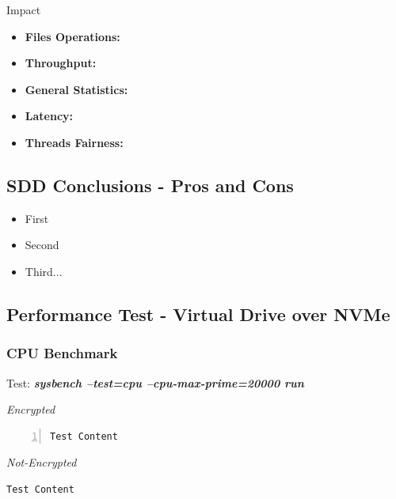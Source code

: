 Impact
\begin{itemize}
  \item \textbf{Files Operations:} 
  \item \textbf{Throughput:} 
  \item \textbf{General Statistics:}
  \item \textbf{Latency:}
  \item \textbf{Threads Fairness:}
\end{itemize}

\newpage
\subsection{SDD Conclusions - Pros and Cons}
\begin{itemize}
  \item First
  \item Second
  \item Third...
\end{itemize}

\newpage
\subsection{Performance Test - Virtual Drive over NVMe}
\subsubsection{CPU Benchmark}
\begin{center}
  Test: \textbf{\textit{sysbench --test=cpu --cpu-max-prime=20000 run}}  
\end{center}
\vspace*{-\baselineskip}
\noindent\begin{minipage}[t]{0.45\linewidth}
  \centering
  \textit{Encrypted}
  \lstset{language=bash,label=SliceExaple}
  \begin{lstlisting}[basicstyle=\tiny,frame=single, numbers=left, label=cpu_test1]
  Test Content      
  \end{lstlisting}
\end{minipage}
\hspace{0.5cm}
\noindent\begin{minipage}[t]{0.45\linewidth}
  \centering
  \textit{Not-Encrypted}
  \begin{lstlisting}[basicstyle=\tiny,frame=single, label=cpu_test2]
  Test Content
  \end{lstlisting}
\end{minipage}

\newpage
